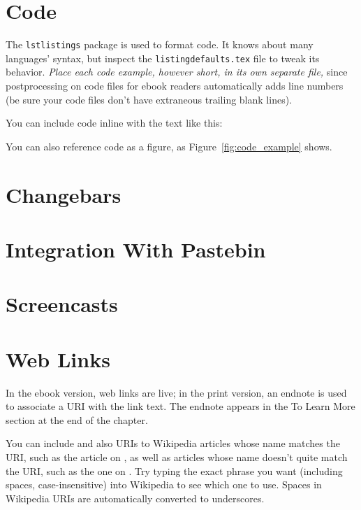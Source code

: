  
\section{Code}

The \texttt{lstlistings} package is used to format code.  It knows about
many languages' syntax, but inspect the \texttt{listingdefaults.tex}
file to tweak its behavior.  
\emph{Place each code example, however
  short, in its own separate file,} since postprocessing on code files
for ebook readers 
automatically adds line numbers (be sure your code files don't have
extraneous trailing blank lines).  

You can include code inline with the text like this:


You can also reference code as a figure, as
Figure~\ref{fig:code_example} shows.




\section{Changebars}

\section{Integration With Pastebin}

\section{Screencasts}

\section{Web Links}

In the ebook version, web links are live; in the print version, an
endnote is used to associate a URI with the link text.  The endnote
appears in the To Learn More section at the end of the chapter.

You can include  and also
URIs to Wikipedia articles whose name matches the URI, such as the
article on , as well as articles whose
name doesn't quite match the URI, such as the one on
.   Try typing the exact
phrase you want (including spaces, case-insensitive) into Wikipedia to
see which one to use.  Spaces in Wikipedia URIs are automatically
converted to underscores.

